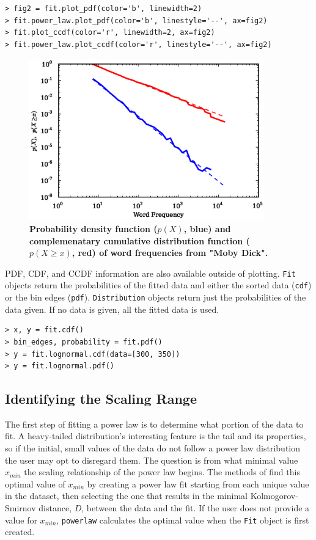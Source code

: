 \documentclass[10pt]{article}
\begin{document}
\begin{verbatim}
> fig2 = fit.plot_pdf(color='b', linewidth=2)
> fit.power_law.plot_pdf(color='b', linestyle='--', ax=fig2)
> fit.plot_ccdf(color='r', linewidth=2, ax=fig2)
> fit.power_law.plot_ccdf(color='r', linestyle='--', ax=fig2)
\end{verbatim}

\begin{figure}[!ht]
\begin{center}
\includegraphics[width=4in]{FigCCDF.eps}
\end{center}
\caption{
{\bf Probability density function ($p(X)$, blue) and complemenatary cumulative distribution function ($p(X\geq x)$, red) of word frequencies from "Moby Dick".}
}
\label{CCDF}
\end{figure}

PDF, CDF, and CCDF information are also available outside of plotting. \verb"Fit" objects return the probabilities of the fitted data and either the sorted data (\verb"cdf") or the bin edges (\verb"pdf"). \verb"Distribution" objects return just the probabilities of the data given. If no data is given, all the fitted data is used.

\begin{verbatim}
> x, y = fit.cdf()
> bin_edges, probability = fit.pdf()
> y = fit.lognormal.cdf(data=[300, 350])
> y = fit.lognormal.pdf()
\end{verbatim}

\subsection*{Identifying the Scaling Range}
The first step of fitting a power law is to determine what portion of the data to fit. A heavy-tailed distribution's interesting feature is the tail and its properties, so if the initial, small values of the data do not follow a power law distribution the user may opt to disregard them. The question is from what minimal value $x_{min}$ the scaling relationship of the power law begins. The methods of \cite{Clauset2009} find this optimal value of $x_{min}$ by creating a power law fit starting from each unique value in the dataset, then selecting the one that results in the minimal Kolmogorov-Smirnov distance, $D$, between the data and the fit. If the user does not provide a value for $x_{min}$, \verb$powerlaw$ calculates the optimal value when the \verb$Fit$ object is first created. 
\end{document}
